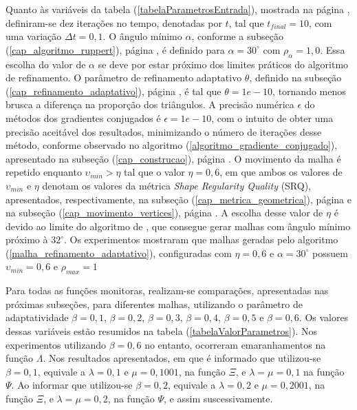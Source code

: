 Quanto às variáveis da tabela (\ref{tabelaParametrosEntrada}), mostrada na página \pageref{tabelaParametrosEntrada}, definiram-se dez iterações no tempo, denotadas por $t$, tal que $t_{final} = 10$, com uma variação $\Delta t = 0,1$. O ângulo mínimo $\alpha$, conforme a subseção (\ref{cap_algoritmo_ruppert}), página \pageref{cap_algoritmo_ruppert}, é definido para $\alpha = 30^{\circ}$ com $\rho_{\alpha} = 1,0$. Essa escolha do valor de $\alpha$ se deve por estar próximo dos limites práticos do algoritmo de refinamento. O parâmetro de refinamento adaptativo $\theta$, definido na subseção (\ref{cap_refinamento_adaptativo}), página \pageref{cap_refinamento_adaptativo}, é tal que $\theta = 1e-10$, tornando menos brusca a diferença na proporção dos triângulos. A precisão numérica $\epsilon$ do métodos dos gradientes conjugados é $\epsilon = 1e-10$, com o intuito de obter uma precisão aceitável dos resultados,  minimizando o número de iterações desse método, conforme observado no algoritmo (\ref{algoritmo_gradiente_conjugado}), apresentado na subseção (\ref{cap_construcao}), página \pageref{algoritmo_gradiente_conjugado}. O movimento da malha é repetido enquanto $\upsilon_{min} > \eta$ tal que o valor $\eta = 0,6$, em que ambos os valores de $\upsilon_{min}$ e $\eta$ denotam os valores da métrica {\it Shape Regularity Quality} (SRQ), apresentados, respectivamente, na subseção (\ref{cap_metrica_geometrica}), página \pageref{cap_metrica_geometrica} e na subseção (\ref{cap_movimento_vertices}), página \pageref{cap_movimento_vertices}. A escolha desse valor de $\eta$ é devido ao limite do algoritmo de , que consegue gerar malhas com ângulo mínimo próximo à $32^{\circ}$. Os experimentos mostraram que malhas geradas pelo algoritmo (\ref{malha_refinamento_adaptativo}), configuradas com $\eta = 0,6$ e $\alpha = 30^{\circ}$ possuem $\upsilon_{min} = 0,6$ e $\rho_{max} = 1$

Para todas as funções monitoras, realizam-se comparações, apresentadas nas próximas subseções, para diferentes malhas, utilizando o parâmetro de adaptatividade $\beta = 0,1$, $\beta = 0,2$, $\beta = 0,3$, $\beta = 0,4$, $\beta = 0,5$ e $\beta = 0,6$. Os valores dessas variáveis estão resumidos na tabela (\ref{tabelaValorParametros}). Nos experimentos utilizando $\beta = 0,6$ no entanto, ocorreram emaranhamentos na função $\Lambda$. Nos resultados apresentados, em que é informado que utilizou-se $\beta = 0,1$, equivale a $\lambda = 0,1$ e $\mu = 0,1001$, na função $\Xi$, e $\lambda = \mu = 0,1$ na função $\Psi$. Ao informar que utilizou-se $\beta = 0,2$, equivale a $\lambda = 0,2$ e $\mu = 0,2001$, na função $\Xi$, e $\lambda = \mu = 0,2$, na função $\Psi$, e assim suscessivamente.

